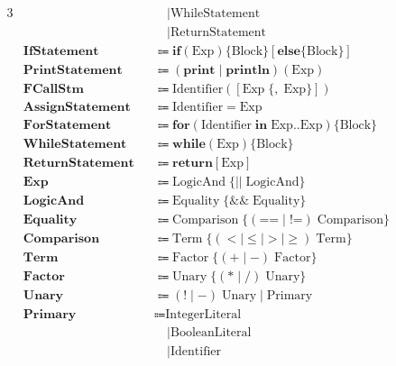 \documentclass[a4paper,11pt]{article}
\begin{document}
\begin{alignat*}{3}
&                       &&\quad\mid  \text{WhileStatement} &&\\
&                       &&\quad\mid  \text{ReturnStatement} &&\\
&\textbf{IfStatement}     &&\Coloneqq  \textbf{if}(\text{Exp})\lbrace \text{Block}\rbrace [\textbf{else}\lbrace \text{Block}\rbrace] &&\\
&\textbf{PrintStatement}  &&\Coloneqq  (\textbf{print}\mid\textbf{println})(\text{Exp}) &&\\
&\textbf{FCallStm}        &&\Coloneqq  \text{Identifier}([\text{Exp}\;\lbrace,\;\text{Exp}\rbrace]) &&\\
&\textbf{AssignStatement} &&\Coloneqq  \text{Identifier} = \text{Exp} &&\\
&\textbf{ForStatement}    &&\Coloneqq  \textbf{for}(\text{Identifier}\;\textbf{in}\;\text{Exp}..\text{Exp})\lbrace \text{Block}\rbrace &&\\
&\textbf{WhileStatement}  &&\Coloneqq  \textbf{while}(\text{Exp})\lbrace \text{Block}\rbrace &&\\
&\textbf{ReturnStatement} &&\Coloneqq  \textbf{return} [\text{Exp}] &&\\
&\textbf{Exp}             &&\Coloneqq  \text{LogicAnd}\;\lbrace\text{||}\;\text{LogicAnd}\rbrace &&\\
&\textbf{LogicAnd}        &&\Coloneqq  \text{Equality}\;\lbrace\text{&&}\;\text{Equality}\rbrace &&\\
&\textbf{Equality}        &&\Coloneqq  \text{Comparison}\;\lbrace(\text{==}\mid\text{!=})\;\text{Comparison}\rbrace &&\\
&\textbf{Comparison}      &&\Coloneqq  \text{Term}\;\lbrace(<\mid\le\mid>\mid\ge)\;\text{Term}\rbrace &&\\
&\textbf{Term}            &&\Coloneqq  \text{Factor}\;\lbrace(+\mid-)\;\text{Factor}\rbrace &&\\
&\textbf{Factor}          &&\Coloneqq  \text{Unary}\;\lbrace(*\mid/)\;\text{Unary}\rbrace &&\\
&\textbf{Unary}           &&\Coloneqq  (!\mid-)\;\text{Unary} \mid \text{Primary} &&\\
&\textbf{Primary}         &&\Coloneqq  \text{IntegerLiteral} &&\\
&                       &&\quad\mid  \text{BooleanLiteral} &&\\
&                       &&\quad\mid  \text{Identifier} &&\\

\end{alignat*}
\end{document}

